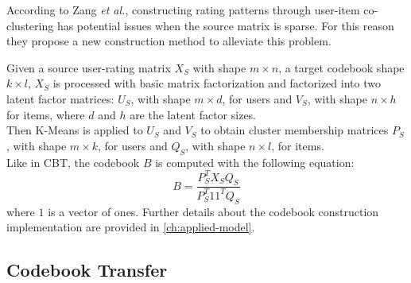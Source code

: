 According to Zang \textit{et al.}, constructing rating patterns through user-item co-clustering has potential issues when the source matrix is sparse. For this reason they propose a new construction method to alleviate this problem.\par
Given a source user-rating matrix $X_S$ with shape $m \times n$, a target codebook shape $k \times l$, $X_S$ is processed with basic matrix factorization and factorized into two latent factor matrices: $U_S$, with shape $m \times d$, for users and $V_S$, with shape $n \times h$ for items, where $d$ and $h$ are the latent factor sizes.\\
Then K-Means is applied to $U_S$ and $V_S$ to obtain cluster membership matrices $P_S$, with shape $m \times k$, for users and $Q_S$, with shape $n \times l$, for items.\\
Like in CBT, the codebook $B$ is computed with the following equation:
\begin{equation}
B = \frac{P_S^T X_S Q_S}{P_S^T 1 1^T Q_S}
\end{equation}
where $1$ is a vector of ones.
Further details about the codebook construction implementation are provided in \autoref{ch:applied-model}.


\subsection{Codebook Transfer}

